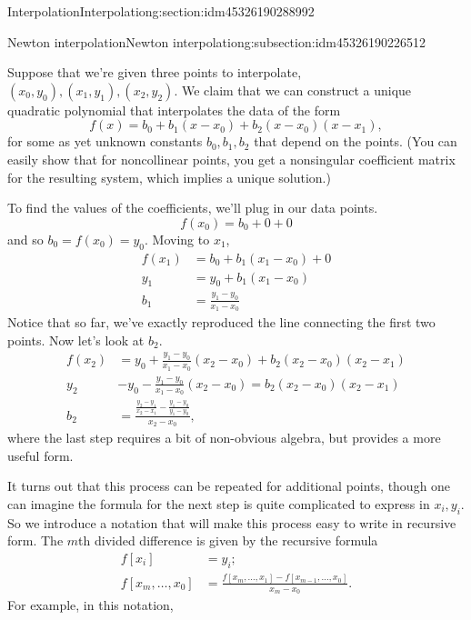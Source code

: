 \documentclass[oneside,10pt,]{article}
\numberwithin{equation}{section}
\numberwithin{equation}{section}
\newcommand{\amp}{&}
\begin{document}
\begin{sectionptx}{Interpolation}{}{Interpolation}{}{}{g:section:idm45326190288992}
\begin{subsectionptx}{Newton interpolation}{}{Newton interpolation}{}{}{g:subsection:idm45326190226512}
\par
Suppose that we're given three points to interpolate, \((x_0,y_0), (x_1, y_1), (x_2, y_2)\). We claim that we can construct a unique quadratic polynomial that interpolates the data of the form%
\begin{equation*}
f(x) = b_0 + b_1 (x - x_0) + b_2 (x - x_0)(x - x_1),
\end{equation*}
for some as yet unknown constants \(b_0, b_1, b_2\) that depend on the points. (You can easily show that for noncollinear points, you get a nonsingular coefficient matrix for the resulting system, which implies a unique solution.)%
\par
To find the values of the coefficients, we'll plug in our data points.%
\begin{equation*}
f(x_0) = b_0 + 0 + 0
\end{equation*}
and so \(b_0 = f(x_0) = y_0\). Moving to \(x_1\),%
\begin{align*}
f(x_1) \amp= b_0 + b_1(x_1 - x_0) + 0\\
y_1 \amp= y_0 + b_1(x_1 - x_0)\\
b_1 \amp= \frac{y_1 - y_0}{x_1 - x_0}
\end{align*}
Notice that so far, we've exactly reproduced the line connecting the first two points. Now let's look at \(b_2\).%
\begin{align*}
f(x_2) \amp= y_0 + \frac{y_1 - y_0}{x_1 - x_0}(x_2 - x_0) + b_2 (x_2 - x_0)(x_2 - x_1)\\
y_2 \amp- y_0 - \frac{y_1 - y_0}{x_1 - x_0}(x_2 - x_0) = b_2 (x_2 - x_0)(x_2 - x_1)\\
b_2 \amp= \frac{\frac{y_2 - y_1}{x_2 - x_1} - \frac{y_1 - y_0}{y_1 - y_0}}{x_2 - x_0},
\end{align*}
where the last step requires a bit of non-obvious algebra, but provides a more useful form.%
\par
It turns out that this process can be repeated for additional points, though one can imagine the formula for the next step is quite complicated to express in \(x_i, y_i\). So we introduce a notation that will make this process easy to write in recursive form. The \(m\)th divided difference is given by the recursive formula%
\begin{align*}
f[x_i] \amp= y_i;\\
f[x_m, \ldots, x_0] \amp= \frac{f[x_m, \ldots, x_1] - f[x_{m-1}, \ldots, x_0]}{x_m - x_0}.
\end{align*}
For example, in this notation,%
\begin{equation*}

\end{equation*}
\end{subsectionptx}
\end{sectionptx}
\end{document}
